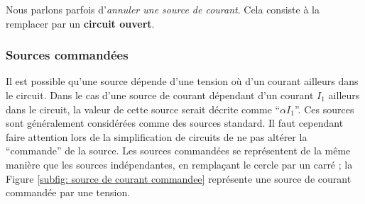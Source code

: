\documentclass[12pt,a4paper]{article}
\begin{document}
 Nous parlons parfois d'\textit{annuler une source de courant}. Cela consiste à la remplacer par un \textbf{circuit ouvert}.

\subsubsection{Sources commandées}
\label{subsubsection: source commandee}
Il est possible qu'une source dépende d'une tension où d'un courant ailleurs dans le circuit. Dans le cas d'une source de courant dépendant d'un courant $I_1$ ailleurs dans le circuit, la valeur de cette source serait décrite comme ``$\alpha I_1$''. Ces sources sont généralement considérées comme des sources standard. Il faut cependant faire attention lors de la simplification de circuits de ne pas altérer la ``commande'' de la source. Les sources commandées se représentent de la même manière que les sources indépendantes, en remplaçant le cercle par un carré ; la Figure \ref{subfig: source de courant commandee} représente une source de courant commandée par une tension.
\end{document}
